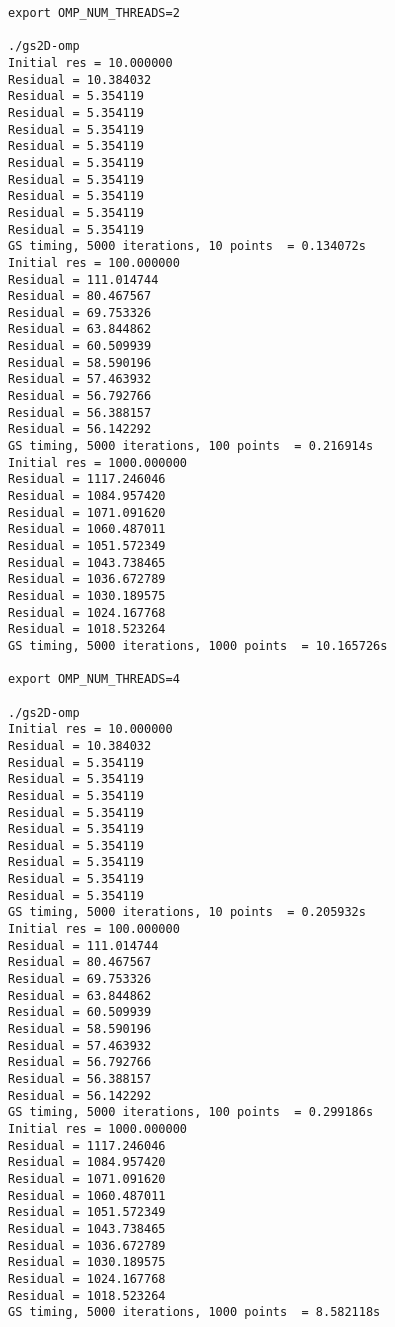 \documentclass{article}
\begin{document}
\begin{enumerate}
\begin{verbatim}
export OMP_NUM_THREADS=2

./gs2D-omp
Initial res = 10.000000
Residual = 10.384032
Residual = 5.354119
Residual = 5.354119
Residual = 5.354119
Residual = 5.354119
Residual = 5.354119
Residual = 5.354119
Residual = 5.354119
Residual = 5.354119
Residual = 5.354119
GS timing, 5000 iterations, 10 points  = 0.134072s
Initial res = 100.000000
Residual = 111.014744
Residual = 80.467567
Residual = 69.753326
Residual = 63.844862
Residual = 60.509939
Residual = 58.590196
Residual = 57.463932
Residual = 56.792766
Residual = 56.388157
Residual = 56.142292
GS timing, 5000 iterations, 100 points  = 0.216914s
Initial res = 1000.000000
Residual = 1117.246046
Residual = 1084.957420
Residual = 1071.091620
Residual = 1060.487011
Residual = 1051.572349
Residual = 1043.738465
Residual = 1036.672789
Residual = 1030.189575
Residual = 1024.167768
Residual = 1018.523264
GS timing, 5000 iterations, 1000 points  = 10.165726s

export OMP_NUM_THREADS=4

./gs2D-omp
Initial res = 10.000000
Residual = 10.384032
Residual = 5.354119
Residual = 5.354119
Residual = 5.354119
Residual = 5.354119
Residual = 5.354119
Residual = 5.354119
Residual = 5.354119
Residual = 5.354119
Residual = 5.354119
GS timing, 5000 iterations, 10 points  = 0.205932s
Initial res = 100.000000
Residual = 111.014744
Residual = 80.467567
Residual = 69.753326
Residual = 63.844862
Residual = 60.509939
Residual = 58.590196
Residual = 57.463932
Residual = 56.792766
Residual = 56.388157
Residual = 56.142292
GS timing, 5000 iterations, 100 points  = 0.299186s
Initial res = 1000.000000
Residual = 1117.246046
Residual = 1084.957420
Residual = 1071.091620
Residual = 1060.487011
Residual = 1051.572349
Residual = 1043.738465
Residual = 1036.672789
Residual = 1030.189575
Residual = 1024.167768
Residual = 1018.523264
GS timing, 5000 iterations, 1000 points  = 8.582118s
    \end{verbatim}
    
    
\end{enumerate}
\end{document}
